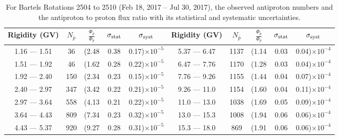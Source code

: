 \begin{table}[p] 
\renewcommand\baselinestretch{1.3}\selectfont
\setlength\tabcolsep{3pt}
\centering
\begin{tabular}{ccccc | ccccc}
\hline
\textbf{Rigidity}  (GV)  & $N_{\bar{p}}$ & $\frac{\Phi_{\bar{p}}}{\Phi_{p}}$ & $\sigma_{\rm{stat}}$ & $\sigma_{\rm{syst}}$ \hspace{1cm}   & \textbf{Rigidity}  (GV)  & $N_{\bar{p}}$ & $\frac{\Phi_{\bar{p}}}{\Phi_{p}}$ & $\sigma_{\rm{stat}}$ & $\sigma_{\rm{syst}}$ \hspace{1cm} \\ 
\hline
1.16 — 1.51   &  36                  &(2.48                          &  0.38              &      0.17)$\times 10^{-5}$  & 5.37 — 6.47                &  1137                    &(1.14                                &  0.03                   &      0.04)$\times 10^{-4}$\\
1.51 — 1.92   &  46                  &(1.62                          &  0.28              &      0.22)$\times 10^{-5}$  & 6.47 — 7.76                &  1170                    &(1.28                                &  0.03                   &      0.04)$\times 10^{-4}$\\
1.92 — 2.40   &  150                &(2.34                          &  0.23              &      0.15)$\times 10^{-5}$  & 7.76 — 9.26                &  1155                    &(1.44                                &  0.04                   &      0.07)$\times 10^{-4}$\\    
2.40 — 2.97   &  347                &(3.42                          &  0.22              &      0.21)$\times 10^{-5}$  & 9.26 — 11.0                &  1154                    &(1.60                                &  0.04                   &      0.11)$\times 10^{-4}$\\    
2.97 — 3.64   &  558                &(4.13                          &  0.21              &      0.22)$\times 10^{-5}$  & 11.0 — 13.0                 &  1038                    &(1.69                                &  0.05                   &      0.09)$\times 10^{-4}$\\
3.64 — 4.43   &  809                &(7.34                          &  0.23              &      0.32)$\times 10^{-5}$  & 13.0 — 15.3               &  1008                    &(1.94                                &  0.06                   &      0.06)$\times 10^{-4}$\\
4.43 — 5.37   &  920                &(9.27                          &  0.28              &      0.31)$\times 10^{-5}$  & 15.3 — 18.0               &  869                      &(1.91                                &  0.06                   &      0.06)$\times 10^{-4}$\\
\hline
\end{tabular}
\caption[Antiproton to proton flux ratio for Bartels Rotations 2504 to 2510]{For Bartels Rotations 2504 to 2510 (Feb 18, 2017 – Jul 30, 2017), the observed antiproton numbers and the antiproton to proton flux ratio with its statistical and systematic uncertainties.}
\label{TableOfDependent14}
\end{table}

